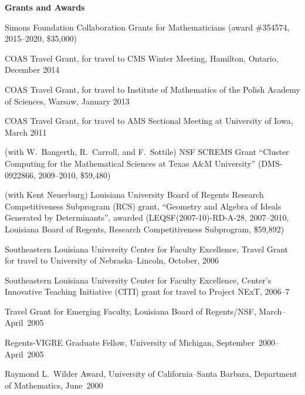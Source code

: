 \documentclass[12pt]{article}
\begin{document}




\textbf{Grants and Awards}
\begin{description}
\setlength{}
\item[] Simons Foundation Collaboration Grants for Mathematicians (award \#354574, 2015--2020, \$35,000)
\item[] COAS Travel Grant, for travel to CMS Winter Meeting, Hamilton, Ontario, December 2014
\item[] COAS Travel Grant, for travel to Institute of Mathematics of the Polish Academy of Sciences, Warsaw, January 2013
\item[] COAS Travel Grant, for travel to AMS Sectional Meeting at University of Iowa, March 2011
\item[] (with W.~Bangerth, R.~Carroll, and F.~Sottile)
NSF SCREMS Grant ``Cluster Computing for the 
Mathematical Sciences at Texas A\&M University''
(DMS-0922866, 2009--2010, \$59,480)
\item[] (with Kent Neuerburg)
Louisiana University Board of Regents Research Competitiveness Subprogram (RCS) grant,
``Geometry and Algebra of Ideals Generated by Determinants'',
awarded 
(LEQSF(2007-10)-RD-A-28, 2007--2010, Louisiana Board of Regents, Research Competitiveness Subprogram, \$59,892)
\item[] Southeastern Louisiana University Center for Faculty Excellence, Travel Grant for travel to University of Nebraska--Lincoln,
October, 2006
\item[] Southeastern Louisiana University Center for Faculty Excellence, Center's Innovative Teaching Initiative (CITI) grant
for travel to Project NExT, 2006--7
\item[] Travel Grant for Emerging Faculty, Louisiana Board of Regents/NSF, 
March--April~2005
\item[] Regents-VIGRE Graduate Fellow, University of Michigan, 
September~2000--April~2005
\item[] Raymond L.~Wilder Award, University of California--Santa Barbara,
Department of Mathematics, 
June~2000
\end{description}
\end{document}
